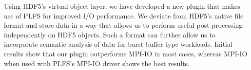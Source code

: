 Using HDF5's virtual object layer, we have developed a new plugin that makes use of PLFS for improved I/O performance. We deviate from HDF5's native file format and store data in a way that allows us to perform useful post-processing independently on HDF5 objects. 
Such a format can further allow us to incorporate semantic analysis of data for burst buffer type workloads. 
Initial results show that our plugin outperforms MPI-IO in most cases, whereas MPI-IO when used with PLFS's MPI-IO driver shows the best results. 

